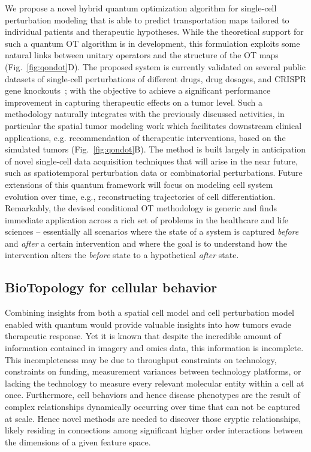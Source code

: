 \documentclass{article}
\begin{document}
We propose a novel hybrid quantum optimization algorithm for single-cell perturbation modeling that is able to predict transportation maps tailored to individual patients and therapeutic hypotheses. 
While the theoretical support for such a quantum OT algorithm is in development, this formulation exploits some natural links between unitary operators and the structure of the OT maps (Fig.~\ref{fig:qondot}D).
The proposed system is currently validated on several public datasets of single-cell perturbations of different drugs, drug dosages, and CRISPR gene knockouts~\cite{srivatsan2020massively,norman2019exploring,gehring2020highly}; with the objective to achieve a significant performance improvement in capturing therapeutic effects on a tumor level. Such a methodology naturally integrates with the previously discussed activities, in particular the spatial tumor modeling work which facilitates downstream clinical applications, e.g. recommendation of therapeutic interventions, based on the simulated tumors (Fig.~\ref{fig:qondot}B). 
The method is built largely in anticipation of novel single-cell data acquisition techniques that will arise in the near future, such as spatiotemporal perturbation data or combinatorial perturbations. 
Future extensions of this quantum framework will focus on modeling cell system evolution over time, e.g., reconstructing trajectories of cell differentiation.
Remarkably, the devised conditional OT methodology is generic and finds immediate application across a rich set of problems in the healthcare and life sciences -- essentially all scenarios where the state of a system is captured \textit{before} and \textit{after} a certain intervention and where the goal is to understand how the intervention alters the \textit{before} state to a hypothetical \textit{after} state.


\subsection{BioTopology for cellular behavior}
Combining insights from both a spatial cell model and cell perturbation model enabled with quantum would provide valuable insights into how tumors evade therapeutic response. Yet it is known that despite the incredible amount of information contained in imagery and omics data, this information is incomplete. This incompleteness may be due to throughput constraints on technology, constraints on funding, measurement variances between technology platforms, or lacking the technology to measure every relevant molecular entity within a cell at once. Furthermore, cell behaviors and hence disease phenotypes are the result of complex relationships dynamically occurring over time that can not be captured at scale. Hence novel methods are needed to discover those cryptic relationships, likely residing in connections among significant higher order interactions between the dimensions of a given feature space.
\end{document}
